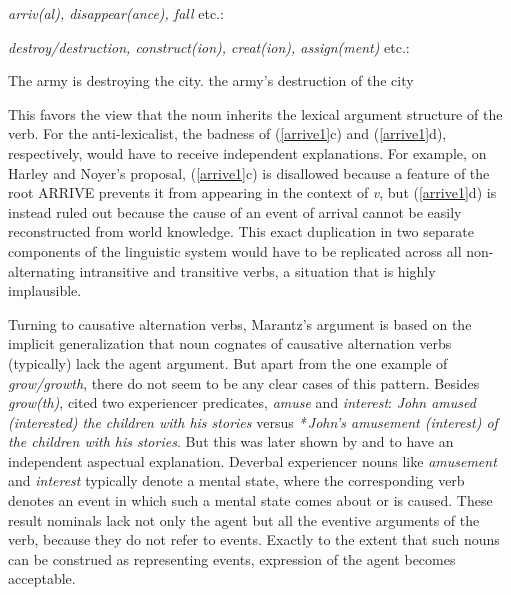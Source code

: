 \begin{exe}\ex
\label{arrive1} 
\emph{arriv(al), disappear(ance), fall} etc.:
\begin{xlist}[iv.]
\zl

\begin{exe}\ex
\label{trans}
\emph{destroy/destruction, construct(ion), creat(ion), assign(ment)} etc.:
\begin{xlist}[iv.]
\ex The army is destroying the city.
\ex the army's destruction of the city
\zl

\noindent
This favors the view that the noun inherits the lexical argument structure of the verb.  For the
anti-lexicalist, the badness of (\ref{arrive1}c) and (\ref{arrive1}d), respectively, would have to
receive independent explanations.  For example, on Harley and Noyer's \citeyear{HN2000a} proposal,
(\ref{arrive1}c) is disallowed because a feature of the root ARRIVE prevents it from appearing in
the context of \emph{v}, but (\ref{arrive1}d) is instead ruled out because the cause of an event of
arrival cannot be easily reconstructed from world knowledge.  This exact duplication in two separate
components of the linguistic system would have to be replicated across all non-alternating
intransitive and transitive verbs, a situation that is highly implausible.

Turning to causative alternation verbs, Marantz's argument is based on the implicit generalization
that noun cognates of causative alternation verbs (typically) lack the agent argument.  But apart
from the one example of \emph{grow/growth}, there do not seem to be any clear cases of this pattern.
Besides \emph{grow(th)}, \citet[examples (7c) and (8c)]{Chomsky70a} cited two experiencer
predicates, \emph{amuse} and \emph{interest}:  \emph{John amused (interested) the children with his
  stories}  versus  \emph{*\,John's amusement (interest) of the children with his stories}.   But this
was later shown by \citet{Rappaport83a-u} and \citet{Dowty89b-u} to have an
independent aspectual explanation.  Deverbal experiencer nouns like \emph{amusement} and
\emph{interest} typically denote a mental state, where the corresponding verb denotes an event in
which such a mental state comes about or is caused.   These result nominals lack not only the agent
but all the eventive arguments of the verb, because they do not refer to events.  Exactly to the
extent that such nouns can be construed as representing events, expression of the agent becomes
acceptable.   


\end{xlist}
\end{exe}
\end{xlist}
\end{exe}
